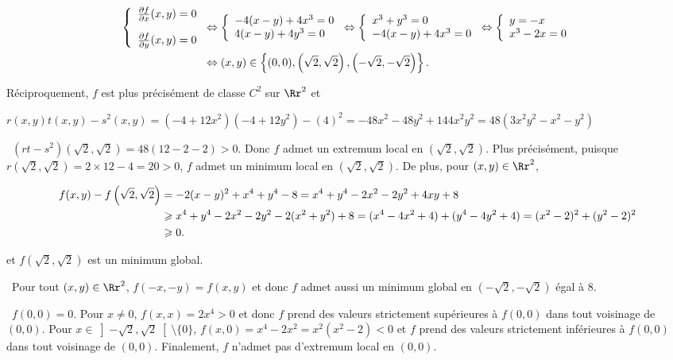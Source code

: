 {\begin{enumerate}
{\begin{align*}\ensuremath
\left\{
\begin{array}{l}
 \frac{\partial f}{\partial x}(x,y)=0\\
\rule{0mm}{7mm} \frac{\partial f}{\partial y}(x,y)=0
\end{array}
\right.&\Leftrightarrow\left\{
\begin{array}{l}
-4(x-y)+4x^3=0\\
4(x-y)+4y^3=0
\end{array}
\right.\Leftrightarrow\left\{
\begin{array}{l}
x^3+y^3=0\\
-4(x-y)+4x^3=0
\end{array}
\right.\Leftrightarrow\left\{
\begin{array}{l}
y=-x\\
x^3-2x=0
\end{array}
\right.\\
 &\Leftrightarrow(x,y)\in\left\{(0,0),\left(\sqrt{2},\sqrt{2}\right),\left(-\sqrt{2},-\sqrt{2}\right)\right\}.
\end{align*}

Réciproquement, $f$ est plus précisément de classe $C^2$ sur $\Rr^2$ et

\begin{center}
$r(x,y)t(x,y)-s^2(x,y)=(-4+12x^2)(-4+12y^2)-(4)^2=-48x^2-48y^2+144x^2y^2=48(3x^2y^2-x^2-y^2)$
\end{center}

\textbullet~$(rt-s^2)\left(\sqrt{2},\sqrt{2}\right)=48(12-2-2)>0$. Donc $f$ admet un extremum local en $\left(\sqrt{2},\sqrt{2}\right)$. Plus précisément, puisque $r\left(\sqrt{2},\sqrt{2}\right)=2\times12-4=20>0$, $f$ admet un minimum local en $\left(\sqrt{2},\sqrt{2}\right)$. De plus, pour $(x,y)\in\Rr^2$,

\begin{align*}\ensuremath
f(x,y)-f\left(\sqrt{2},\sqrt{2}\right)&=-2(x-y)^2+x^4+y^4-8=x^4+y^4-2x^2-2y^2+4xy+8\\
 &\geqslant x^4+y^4-2x^2-2y^2-2(x^2+y^2)+8=(x^4-4x^2+4)+(y^4-4y^2+4)=(x^2-2)^2+(y^2-2)^2\\
 &\geqslant0.
\end{align*}

et $f\left(\sqrt{2},\sqrt{2}\right)$ est un minimum global.

\textbullet~Pour tout $(x,y)\in\Rr^2$, $f(-x,-y)=f(x,y)$ et donc $f$ admet aussi un minimum global en $\left(-\sqrt{2},-\sqrt{2}\right)$ égal à $8$.

\textbullet~$f(0,0)=0$. Pour $x\neq0$, $f(x,x)=2x^4>0$ et donc $f$ prend des valeurs strictement supérieures à $f(0,0)$ dans tout voisinage de $(0,0)$. Pour $x\in\left]-\sqrt{2},\sqrt{2}\right[\setminus\{0\}$, $f(x,0)=x^4-2x^2=x^2(x^2-2)<0$ et $f$ prend des valeurs strictement inférieures à $f(0,0)$ dans tout voisinage de $(0,0)$. Finalement, $f$ n'admet pas d'extremum local en $(0,0)$.

\begin{center}
\end{center}}
\end{enumerate}
}
